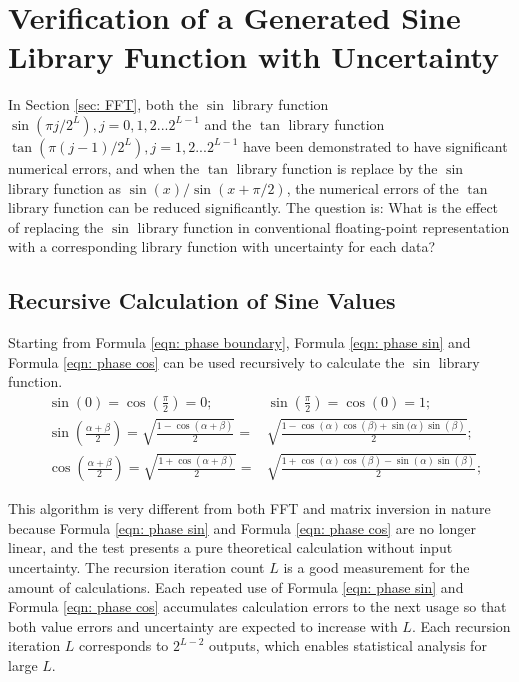 \documentclass[twoside]{article}
\numberwithin{equation}{section}
\begin{document}
\clearpage
\section{Verification of a Generated Sine Library Function with Uncertainty}
\label{sec: recursion}

In Section \ref{sec: FFT}, both the $\sin$ library function $\sin(\pi j /2^L), j = 0, 1, 2 ... 2^{L-1}$ and the $\tan$ library function $\tan(\pi (j - 1) /2^L), j = 1, 2 ... 2^{L-1}$ have been demonstrated to have significant numerical errors, and when the $\tan$ library function is replace by the $\sin$ library function as $\sin(x) / \sin(x + \pi/2)$, the numerical errors of the $\tan$ library function can be reduced significantly.
The question is: What is the effect of replacing the $\sin$ library function in conventional floating-point representation with a corresponding library function with uncertainty for each data?


\subsection{Recursive Calculation of Sine Values}

Starting from Formula \eqref{eqn: phase boundary}, Formula \eqref{eqn: phase sin} and Formula \eqref{eqn: phase cos} can be used recursively to calculate the $\sin$ library function.  
\begin{align}
\label{eqn: phase boundary}
& \sin(0) = \cos(\frac{\pi}{2}) = 0; & \sin(\frac{\pi}{2}) = \cos(0) = 1; \\
\label{eqn: phase sin}
& \sin \left(\frac{\alpha + \beta}{2} \right) = \sqrt{\frac{1 - \cos \left(\alpha + \beta \right)}{2}} = & \sqrt{\frac{1 - \cos(\alpha) \cos \left(\beta) + \sin(\alpha \right) \sin(\beta)}{2}}; \\
\label{eqn: phase cos}
& \cos \left(\frac{\alpha + \beta}{2} \right) = \sqrt{\frac{1 + \cos \left(\alpha + \beta \right)}{2}} = & \sqrt{\frac{1 + \cos(\alpha) \cos(\beta) - \sin(\alpha) \sin(\beta)}{2}};
\end{align}

This algorithm is very different from both FFT and matrix inversion in nature because Formula \eqref{eqn: phase sin} and Formula \eqref{eqn: phase cos} are no longer linear, and the test presents a pure theoretical calculation without input uncertainty.  The recursion iteration count $L$ is a good measurement for the amount of calculations.  Each repeated use of Formula \eqref{eqn: phase sin} and Formula \eqref{eqn: phase cos} accumulates calculation errors to the next usage so that both value errors and uncertainty are expected to increase with $L$.  Each recursion iteration $L$ corresponds to $2^{L-2}$ outputs, which enables statistical analysis for large $L$.  
\end{document}
